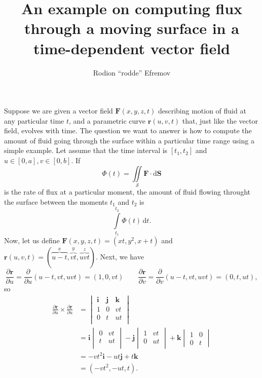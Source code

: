 \documentclass[10pt]{article}
\title{An example on computing flux through a moving surface in a time-dependent vector field}
\author{Rodion ``rodde'' Efremov}
\begin{document}
 \maketitle

Suppose we are given a vector field $\mathbf{F}(x, y, z, t)$ describing motion of fluid at any particular time $t$, and a parametric curve $\mathbf{r}(u, v, t)$ that, just like the vector field, evolves with time. The question we want to answer is how to compute the amount of fluid going through the surface within a particular time range using a simple example. Let assume that the time interval is $[t_1, t_2]$ and $u \in [0, a], v \in [0, b]$. If
\[
\Phi(t) = \iint\limits_{\mathcal{S}} \mathbf{F} \cdot \mathrm{d}\mathbf{S} 
\]
is the rate of flux at a particular moment, the amount of fluid flowing throught the surface between the moments $t_1$ and $t_2$ is
\[
\int\limits_{t_1}^{t_2} \Phi(t) \, \mathrm{d}t.
\]
Now, let us define $\mathbf{F}(x, y, z, t) = (xt, y^2, x + t)$ and $\mathbf{r}(u, v, t) = (\overbrace{u - t}^x, \overbrace{vt	}^y, \overbrace{uvt}^z).$ Next, we have
\[
\frac{\partial \mathbf{r}}{\partial u} = \frac{\partial}{\partial u} (u - t, vt, uvt) = (1, 0, vt) \qquad \frac{\partial \mathbf{r}}{\partial v} = \frac{\partial}{\partial v}(u - t, vt, uvt) = (0, t, ut),
\]
so
\begin{align*}
\frac{\partial \mathbf{r}}{\partial u} \times \frac{\partial \mathbf{r}}{\partial u} &= 
  \begin{vmatrix}
  \mathbf{i} & \mathbf{j} & \mathbf{k} \\
  1 & 0 & vt \\
  0 & t & ut \\
  \end{vmatrix} \\
  &= 
  \mathbf{i} \begin{vmatrix}
  0 & vt \\
  t & ut \\
  \end{vmatrix}
  -
  \mathbf{j} \begin{vmatrix}
  1 & vt \\
  0 & ut \\
  \end{vmatrix}
  +
  \mathbf{k}
  \begin{vmatrix}
  1 & 0 \\
  0 & t
  \end{vmatrix} \\
  &=
  -vt^2\mathbf{i} -ut\mathbf{j} + t\mathbf{k} \\
  &= (-vt^2, -ut, t).
\end{align*}
\end{document}
